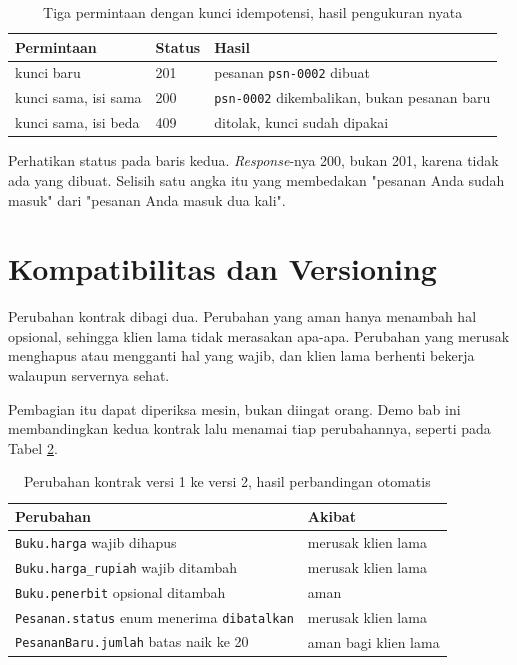 \begin{table}[!htb]
  \centering
  \caption{Tiga permintaan dengan kunci idempotensi, hasil pengukuran nyata}
  \label{tab:idempoten}
  \begin{tabularx}{\textwidth}{Xll}
    \hline
    \textbf{Permintaan} & \textbf{Status} & \textbf{Hasil} \\
    \hline
    kunci baru & 201 & pesanan \texttt{psn-0002} dibuat \\
    \hline
    kunci sama, isi sama & 200 & \texttt{psn-0002} dikembalikan, bukan pesanan baru \\
    \hline
    kunci sama, isi beda & 409 & ditolak, kunci sudah dipakai \\
    \hline
  \end{tabularx}
\end{table}

Perhatikan status pada baris kedua. \textit{Response}-nya 200, bukan 201, karena tidak
ada yang dibuat. Selisih satu angka itu yang membedakan "pesanan Anda sudah
masuk" dari "pesanan Anda masuk dua kali".

\section{Kompatibilitas dan Versioning}

Perubahan kontrak dibagi dua. Perubahan yang aman hanya menambah hal
opsional, sehingga klien lama tidak merasakan apa-apa. Perubahan yang merusak
menghapus atau mengganti hal yang wajib, dan klien lama berhenti bekerja
walaupun servernya sehat.

Pembagian itu dapat diperiksa mesin, bukan diingat orang. Demo bab ini
membandingkan kedua kontrak lalu menamai tiap perubahannya, seperti pada
Tabel \ref{tab:beda-versi}.

\begin{table}[!htb]
  \centering
  \caption{Perubahan kontrak versi 1 ke versi 2, hasil perbandingan otomatis}
  \label{tab:beda-versi}
  \begin{tabularx}{\textwidth}{Xl}
    \hline
    \textbf{Perubahan} & \textbf{Akibat} \\
    \hline
    \texttt{Buku.harga} wajib dihapus & merusak klien lama \\
    \hline
    \texttt{Buku.harga\_rupiah} wajib ditambah & merusak klien lama \\
    \hline
    \texttt{Buku.penerbit} opsional ditambah & aman \\
    \hline
    \texttt{Pesanan.status} enum menerima \texttt{dibatalkan} & merusak klien lama \\
    \hline
    \texttt{PesananBaru.jumlah} batas naik ke 20 & aman bagi klien lama \\
    \hline
  \end{tabularx}
\end{table}

